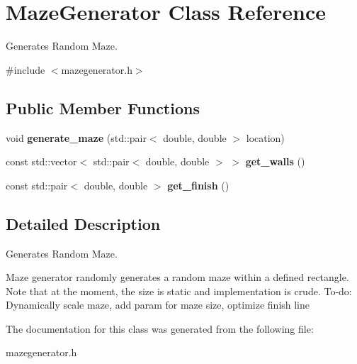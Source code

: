 \hypertarget{classMazeGenerator}{}\section{Maze\+Generator Class Reference}
\label{classMazeGenerator}


Generates Random Maze.  




{\ttfamily \#include $<$mazegenerator.\+h$>$}

\subsection*{Public Member Functions}
\begin{DoxyCompactItemize}
\item 
\mbox{\label{classMazeGenerator_a67dbf663cdcc539fdb7583e8adcd58dc}} 
void {\bfseries generate\+\_\+maze} (std\+::pair$<$ double, double $>$ location)
\item 
\mbox{\label{classMazeGenerator_ad3273f40be7ddb219fb419a8c0d707c3}} 
const std\+::vector$<$ std\+::pair$<$ double, double $>$ $>$ {\bfseries get\+\_\+walls} ()
\item 
\mbox{\label{classMazeGenerator_a98a262b1588845a44c47ff59f9f3dccd}} 
const std\+::pair$<$ double, double $>$ {\bfseries get\+\_\+finish} ()
\end{DoxyCompactItemize}


\subsection{Detailed Description}
Generates Random Maze. 

Maze generator randomly generates a random maze within a defined rectangle. Note that at the moment, the size is static and implementation is crude. To-\/do\+: Dynamically scale maze, add param for maze size, optimize finish line 

The documentation for this class was generated from the following file\+:\begin{DoxyCompactItemize}
\item 
mazegenerator.\+h\end{DoxyCompactItemize}
